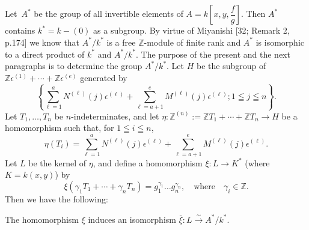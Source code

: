\subsection{}\label{chap2:5.13}
Let\pageoriginale\ $A^{\ast}$ be the group of all invertible elements
of $A=k\left[x,y,\dfrac{f}{g}\right]$. Then $A^{\ast}$ contains $k^{\ast}=k-(0)$
as a subgroup. By virtue of Miyanishi [32; Remark 2, p.174] we know
that $A^{\ast}/k^{\ast}$ is a free $\mathbb{Z}$-module of finite rank
and $A^{\ast}$ is isomorphic to a direct product of $k^{\ast}$ and
$A^{\ast}/k^{\ast}$. The purpose of the present and the next
paragraphs is to determine the group $A^{\ast}/k^{\ast}$. Let $H$ be
the subgroup of
$\mathbb{Z}\epsilon^{(1)}+\cdots+\mathbb{Z}\epsilon^{(e)}$ generated
by
$$
\left\{\sum^{a}_{\ell=1}N^{(\ell)}(j)\epsilon^{(\ell)}+\sum^{e}_{\ell=a+1}M^{(\ell)}(j)\epsilon^{(\ell)};1\leqq
j\leqq n\right\}. 
$$
Let $T_{1},\ldots,T_{n}$ be $n$-indeterminates, and let
$\eta:\mathbb{Z}^{(n)}:=\mathbb{Z}T_{1}+\cdots+\mathbb{Z}T_{n}\to H$
be a homomorphism such that, for $1\leqq i\leqq n$,
$$
\eta(T_{i})=\sum^{a}_{\ell=1}N^{(\ell)}(j)\epsilon^{(\ell)}+\sum^{e}_{\ell=a+1}M^{(\ell)}(j)\epsilon^{(\ell)}.
$$
Let $L$ be the kernel of $\eta$, and define a homomorphism $\xi:L\to
K^{\ast}$ (where $K=k(x,y)$) by
$$
\xi(\gamma_{1}T_{1}+\cdots+\gamma_{n}T_{n})=g^{\gamma_{1}}_{1}\ldots
g^{\gamma_{n}}_{n},\quad\text{where}\quad \gamma_{i}\in\mathbb{Z}.
$$
Then we have the following:

\begin{lemma*}
The homomorphism $\xi$ induces an isomorphism $\overline{\xi}:L\xrightarrow{\sim}A^{\ast}/k^{\ast}$.
\end{lemma*}

